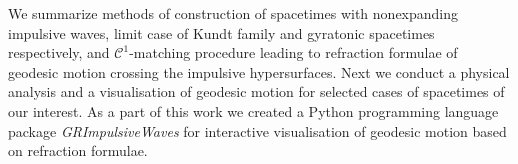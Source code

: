 \documentclass[12pt]{report}
\begin{document}

We summarize methods of construction of spacetimes with nonexpanding impulsive waves,
limit case of Kundt family and gyratonic spacetimes respectively, and $\mathcal{C}^1$-matching procedure
leading to refraction formulae of geodesic motion crossing the impulsive hypersurfaces.
Next we conduct a physical analysis and a visualisation of geodesic motion for selected cases of spacetimes of our interest.
As a part of this work we created a Python programming language package \emph{GRImpulsiveWaves} for
interactive visualisation of geodesic motion based on refraction formulae.
\end{document}
